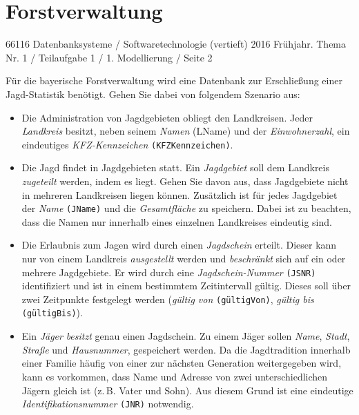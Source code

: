 \documentclass{article}
\begin{document}
%

\section{Forstverwaltung}

66116 Datenbanksysteme / Softwaretechnologie (vertieft) 2016 Frühjahr.
Thema Nr. 1 / Teilaufgabe 1 / 1. Modellierung / Seite 2

\bigskip

\noindent
Für die bayerische Forstverwaltung wird eine Datenbank zur Erschließung
einer Jagd-Statistik benötigt. Gehen Sie dabei von folgendem Szenario
aus:

\begin{itemize}
\item Die Administration von Jagdgebieten obliegt den
Landkreisen. Jeder \emph{Landkreis} besitzt, neben seinem
\emph{Namen} (LName) und der \emph{Einwohnerzahl}, ein
eindeutiges \emph{KFZ-Kennzeichen} \texttt{(KFZKennzeichen)}.

\item Die Jagd findet in Jagdgebieten statt. Ein \emph{Jagdgebiet}
soll dem Landkreis \emph{zugeteilt} werden, indem es liegt.
Gehen Sie davon aus, dass Jagdgebiete nicht in mehreren Landkreisen
liegen können. Zusätzlich ist für jedes Jagdgebiet der
\emph{Name} \texttt{(JName)} und die \emph{Gesamtfläche}
zu speichern. Dabei ist zu beachten, dass die Namen nur innerhalb eines
einzelnen Landkreises eindeutig sind.

\item Die Erlaubnis zum Jagen wird durch einen \emph{Jagdschein}
erteilt. Dieser kann nur von einem Landkreis
\emph{ausgestellt} werden und \emph{beschränkt} sich
auf ein oder mehrere Jagdgebiete. Er wird durch eine
\emph{Jagdschein-Nummer} \texttt{(JSNR)} identifiziert und ist in
einem bestimmtem Zeitintervall gültig. Dieses soll über zwei Zeitpunkte
festgelegt werden (\emph{gültig von} \texttt{(gültigVon)},
\emph{gültig bis} \texttt{(gültigBis)}).

\item Ein \emph{Jäger} \emph{besitzt} genau einen
Jagdschein. Zu einem Jäger sollen \emph{Name},
\emph{Stadt}, \emph{Straße} und \emph{Hausnummer},
gespeichert werden. Da die Jagdtradition innerhalb einer Familie häufig
von einer zur nächsten Generation weitergegeben wird, kann es vorkommen,
dass Name und Adresse von zwei unterschiedlichen Jägern gleich ist
(z.\,B. Vater und Sohn). Aus diesem Grund ist eine eindeutige
\emph{Identifikationsnummer} \texttt{(JNR)} notwendig.


\end{itemize}
\end{document}
